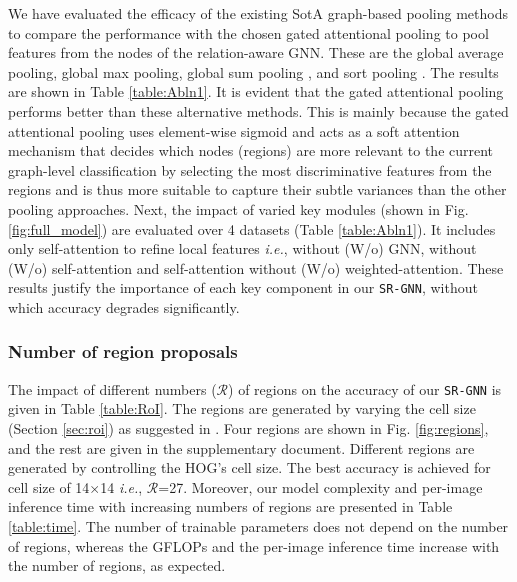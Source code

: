 \documentclass[journal]{IEEEtran}
\begin{document}
We have evaluated the efficacy of the existing SotA graph-based pooling methods to compare the performance with the chosen gated attentional pooling to pool features from the nodes of the relation-aware GNN. These are the global average pooling, global max pooling, global sum pooling \cite{xu2018powerful}, and sort pooling \cite{zhang2018end}. The results are shown in Table \ref{table:Abln1}. It is evident that the gated attentional pooling performs better than these alternative methods. This is mainly because the gated attentional pooling uses element-wise sigmoid and acts as a soft attention mechanism that decides which nodes (regions) are more relevant to the current graph-level classification by selecting the most discriminative features from the regions and is thus more suitable to capture their subtle variances than the other pooling approaches. Next, the impact of varied key modules (shown in Fig. \ref{fig:full_model}) are evaluated over 4 datasets (Table \ref{table:Abln1}). It includes only self-attention to refine local features \textit{i.e.}, without (W/o) GNN, without (W/o) self-attention and self-attention without (W/o) weighted-attention. These results justify the importance of each key component in our \texttt{SR-GNN}, without which accuracy degrades significantly. 

\subsubsection{Number of region proposals}
The impact of different numbers ($\mathcal{R}$) of regions on the accuracy of our \texttt{SR-GNN} is given in Table \ref{table:RoI}. The regions are generated by varying the cell size (Section \ref{sec:roi}) as suggested in \cite{behera2020regional}. Four regions are shown in Fig. \ref{fig:regions}, and the rest are given in the supplementary document. Different regions are generated by controlling the HOG's cell size. The best accuracy is achieved for cell size of 14$\times$14 \textit{i.e.},  $\mathcal{R}$=27. Moreover, our model complexity and per-image inference time with increasing numbers of regions are presented in Table \ref{table:time}. The number of trainable parameters does not depend on the number of regions, whereas the GFLOPs and the per-image inference time increase with the number of regions, as expected.
\end{document}
